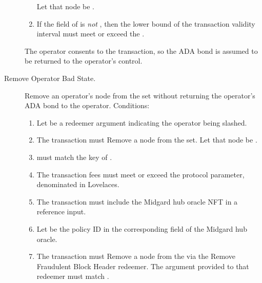 \documentclass[../midgard.tex]{subfiles}
\begin{document}
\begin{description}
\begin{enumerate}
              Let that node be .
            \item If the  field of  is \emph{not} , then the lower bound of the transaction validity interval must meet or exceed the .
        \end{enumerate}
    The operator consents to the transaction, so the ADA bond is assumed to be returned to the operator's control.
    \item[Remove Operator Bad State.] Remove an operator's node from the  set without returning the operator's ADA bond to the operator.
      Conditions:
        \begin{enumerate}
            \item Let  be a redeemer argument indicating the operator being slashed.
            \item The transaction must Remove a node from the  set.
              Let that node be .
            \item {} must match the key of .
            \item The transaction fees must meet or exceed the  protocol parameter, denominated in Lovelaces.
            \item The transaction must include the Midgard hub oracle NFT in a reference input.
            \item Let  be the policy ID in the corresponding field of the Midgard hub oracle.
            \item The transaction must Remove a node from the  via the Remove Fraudulent Block Header redeemer.
              The  argument provided to that redeemer must match .
        \end{enumerate}


\end{description}
\end{document}
